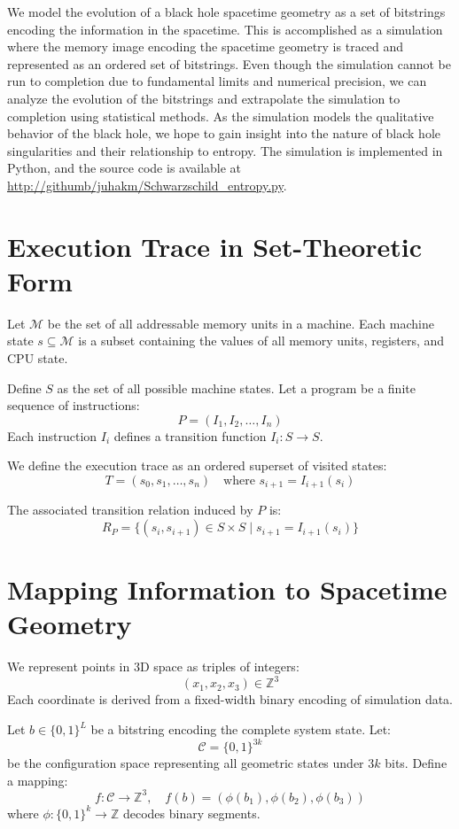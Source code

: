 \documentclass[11pt]{article}
\begin{document}
We model the evolution of a black hole spacetime geometry as a set of bitstrings encoding the information in the spacetime. This is accomplished as a simulation where the memory image encoding the spacetime geometry is traced and represented as an ordered set of bitstrings. Even though the simulation cannot be run to  completion due to  fundamental limits and numerical precision, we can analyze the evolution of the bitstrings and extrapolate the simulation to completion using statistical methods. As the simulation
models the qualitative behavior of the black hole, we hope to gain insight into the nature of black hole singularities and their relationship to entropy.
The simulation is implemented in Python, and the source code is available at \url{http://githumb/juhakm/Schwarzschild\_entropy.py}.


\section{Execution Trace in Set-Theoretic Form}

Let $\mathcal{M}$ be the set of all addressable memory units in a machine. Each machine state $s \subseteq \mathcal{M}$ is a subset containing the values of all memory units, registers, and CPU state.

Define $S$ as the set of all possible machine states. Let a program be a finite sequence of instructions:
\[
  P = (I_1, I_2, \dots, I_n)
\]
Each instruction $I_i$ defines a transition function $I_i : S \to S$.

We define the execution trace as an ordered superset of visited states:
\[
  T = (s_0, s_1, \dots, s_n) \quad \text{where } s_{i+1} = I_{i+1}(s_i)
\]

The associated transition relation induced by $P$ is:
\[
  R_P = \{ (s_i, s_{i+1}) \in S \times S \mid s_{i+1} = I_{i+1}(s_i) \}
\]

\section{Mapping Information to Spacetime Geometry}

We represent points in 3D space as triples of integers:
\[
  (x_1, x_2, x_3) \in \mathbb{Z}^3
\]
Each coordinate is derived from a fixed-width binary encoding of simulation data.

Let $b \in \{0,1\}^L$ be a bitstring encoding the complete system state. Let:
\[
  \mathcal{C} = \{0,1\}^{3k}
\]
be the configuration space representing all geometric states under $3k$ bits. Define a mapping:
\[
  f : \mathcal{C} \to \mathbb{Z}^3, \quad f(b) = (\phi(b_1), \phi(b_2), \phi(b_3))
\]
where $\phi : \{0,1\}^k \to \mathbb{Z}$ decodes binary segments.
\end{document}

